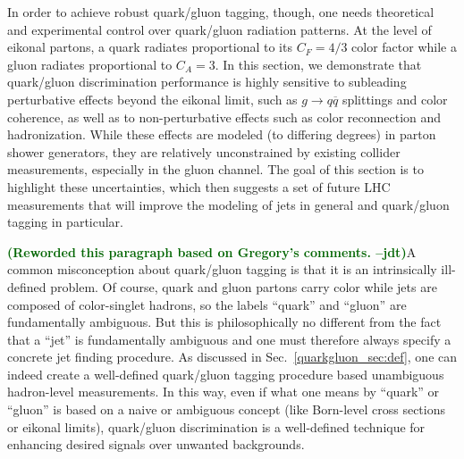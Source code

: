 \documentclass[11pt]{cernrep}
\newcommand{\jdt}[1]{\textbf{\textcolor{darkgreen}{(#1 --jdt)}}}
\begin{document}
In order to achieve robust quark/gluon tagging, though, one needs theoretical and experimental control over quark/gluon radiation patterns.  At the level of eikonal partons, a quark radiates proportional to its $C_F = 4/3$ color factor while a gluon radiates proportional to $C_A = 3$.  In this section, we demonstrate that quark/gluon discrimination performance is highly sensitive to subleading perturbative effects beyond the eikonal limit, such as $g \to q \overline{q}$ splittings and color coherence, as well as to non-perturbative effects such as color reconnection and hadronization.   While these effects are modeled (to differing degrees) in parton shower generators, they are relatively unconstrained by existing collider measurements, especially in the gluon channel.  The goal of this section is to highlight these uncertainties, which then suggests a set of future LHC measurements that will improve the modeling of jets in general and quark/gluon tagging in particular.

\jdt{Reworded this paragraph based on Gregory's comments.}A common misconception about quark/gluon tagging is that it is an intrinsically ill-defined problem.  Of course, quark and gluon partons carry color while jets are composed of color-singlet hadrons, so the labels ``quark'' and ``gluon'' are fundamentally ambiguous. 
But this is philosophically no different from the fact that a ``jet'' is fundamentally ambiguous and one must therefore always specify a concrete jet finding procedure.  As discussed in Sec.~\ref{quarkgluon_sec:def}, one can indeed create a well-defined quark/gluon tagging procedure based unambiguous hadron-level measurements.  In this way, even if what one means by ``quark'' or ``gluon'' is based on a naive or ambiguous concept (like Born-level cross sections or eikonal limits), quark/gluon discrimination is a well-defined technique for enhancing desired signals over unwanted backgrounds.
  
\end{document}
